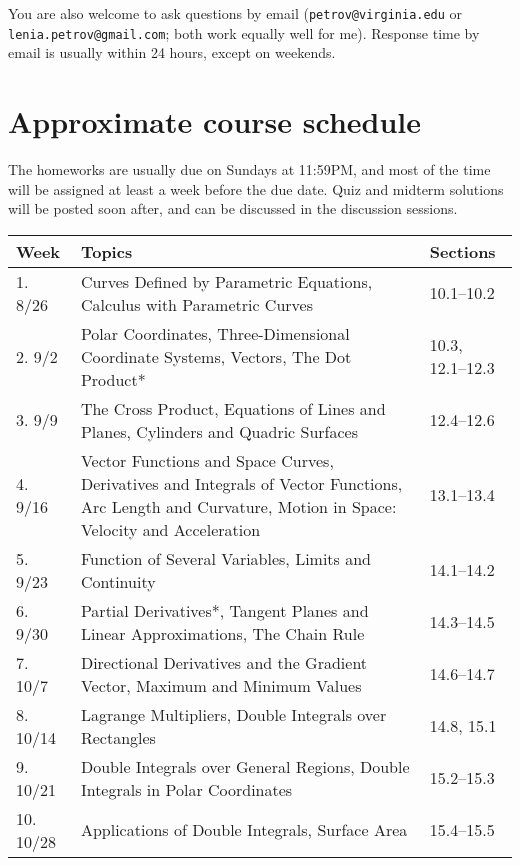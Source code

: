 \documentclass[oneside,11pt]{amsart}
\begin{document}
You are also welcome to ask questions by email (\texttt{petrov@virginia.edu} or
\texttt{lenia.petrov@gmail.com}; both work equally well for me). Response time by email is usually within 24 hours, except on weekends.

\section{Approximate course schedule}

The homeworks are usually due on Sundays at 11:59PM, and most of the time will be assigned at least a week before the due date. Quiz and midterm solutions will be posted soon after, and can be discussed in the discussion sessions.


\vspace{5pt}


\begin{center}
\begin{longtable}{|l|p{}|l|}
    \hline
    \textbf{Week} & \textbf{Topics} & \textbf{Sections} \\
    \hline
    1. 8/26 & Curves Defined by Parametric Equations, Calculus with Parametric Curves & 10.1--10.2 \\
    \hline
    2. 9/2 & Polar Coordinates, Three-Dimensional Coordinate Systems, Vectors, The Dot Product* & 10.3, 12.1--12.3 \\
    \hline
    3. 9/9 & The Cross Product, Equations of Lines and Planes, Cylinders and Quadric Surfaces & 12.4--12.6 \\
    \hline
		4. 9/16 & Vector Functions and Space Curves, Derivatives and Integrals of Vector Functions, Arc Length and Curvature,
		 Motion in Space: Velocity and Acceleration& 13.1--13.4 \\
    \hline
    5. 9/23 & Function of Several Variables, Limits and Continuity & 14.1--14.2 \\
    \hline
    6. 9/30 & Partial Derivatives*, Tangent Planes and Linear Approximations, The Chain Rule & 14.3--14.5 \\
    \hline
    7. 10/7 & Directional Derivatives and the Gradient Vector, Maximum and Minimum Values & 14.6--14.7 \\
    \hline
    8. 10/14 & Lagrange Multipliers, Double Integrals over Rectangles & 14.8, 15.1 \\
    \hline
    9. 10/21 & Double Integrals over General Regions, Double Integrals in Polar Coordinates & 15.2--15.3 \\
    \hline
    10. 10/28 & Applications of Double Integrals, Surface Area & 15.4--15.5 \\

\end{longtable}
\end{center}
\end{document}

